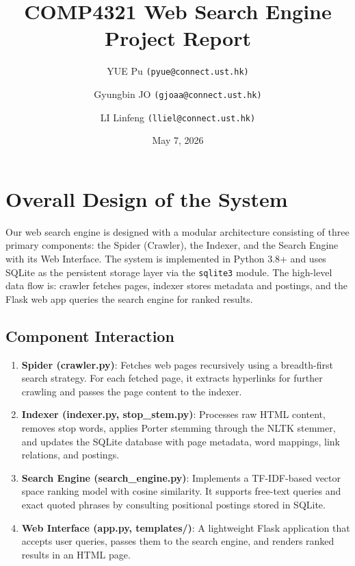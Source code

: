 \documentclass[11pt,a4paper]{article}
\title{\textbf{COMP4321 Web Search Engine Project Report}}
\author{
    YUE Pu \texttt{(pyue@connect.ust.hk)} \\
    \and
    Gyungbin JO \texttt{(gjoaa@connect.ust.hk)} \\
    \and
    LI Linfeng \texttt{(lliel@connect.ust.hk)} \\
}
\date{May 7, 2026}
\begin{document}
\maketitle
\thispagestyle{empty}
\newpage

\tableofcontents
\newpage

\section{Overall Design of the System}
Our web search engine is designed with a modular architecture consisting of three primary components: the Spider (Crawler), the Indexer, and the Search Engine with its Web Interface. The system is implemented in Python 3.8+ and uses SQLite as the persistent storage layer via the \texttt{sqlite3} module. The high-level data flow is: crawler fetches pages, indexer stores metadata and postings, and the Flask web app queries the search engine for ranked results.

\subsection{Component Interaction}
\begin{enumerate}
    \item \textbf{Spider (crawler.py)}: Fetches web pages recursively using a breadth-first search strategy. For each fetched page, it extracts hyperlinks for further crawling and passes the page content to the indexer.
    \item \textbf{Indexer (indexer.py, stop\_stem.py)}: Processes raw HTML content, removes stop words, applies Porter stemming through the NLTK stemmer, and updates the SQLite database with page metadata, word mappings, link relations, and postings.
    \item \textbf{Search Engine (search\_engine.py)}: Implements a TF-IDF-based vector space ranking model with cosine similarity. It supports free-text queries and exact quoted phrases by consulting positional postings stored in SQLite.
    \item \textbf{Web Interface (app.py, templates/)}: A lightweight Flask application that accepts user queries, passes them to the search engine, and renders ranked results in an HTML page.
\end{enumerate}

\end{document}

